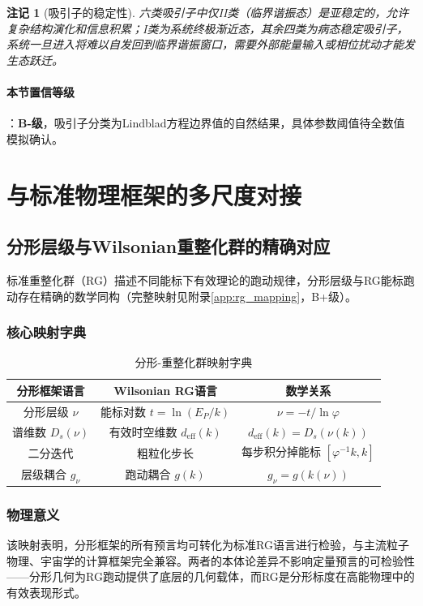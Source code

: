 \documentclass[12pt,a4paper,twocolumn]{article}
\renewcommand{\phi}{\varphi}
\newtheorem{remark}[theorem]{注记}
\begin{document}
\begin{remark}[吸引子的稳定性]
六类吸引子中仅II类（临界谐振态）是亚稳定的，允许复杂结构演化和信息积累；I类为系统终极渐近态，其余四类为病态稳定吸引子，系统一旦进入将难以自发回到临界谐振窗口，需要外部能量输入或相位扰动才能发生态跃迁。
\end{remark}

\paragraph{本节置信等级}：\textbf{B-级}，吸引子分类为Lindblad方程边界值的自然结果，具体参数阈值待全数值模拟确认。

\section{与标准物理框架的多尺度对接}

\subsection{分形层级与Wilsonian重整化群的精确对应}
标准重整化群（RG）描述不同能标下有效理论的跑动规律，分形层级与RG能标跑动存在精确的数学同构（完整映射见附录\ref{app:rg_mapping}，B+级）。

\subsubsection{核心映射字典}
\begin{table}[H]
\centering
\footnotesize
\caption{分形-重整化群映射字典}
\begin{tabular}{c|c|c}
\hline
\textbf{分形框架语言} & \textbf{Wilsonian RG语言} & \textbf{数学关系} \\
\hline
分形层级 $\nu$ & 能标对数 $t=\ln(E_P/k)$ & $\nu = -t/\ln\phi$ \\
谱维数 $D_s(\nu)$ & 有效时空维数 $d_{\text{eff}}(k)$ & $d_{\text{eff}}(k) = D_s(\nu(k))$ \\
二分迭代 & 粗粒化步长 & 每步积分掉能标 $[\phi^{-1}k,k]$ \\
层级耦合 $g_\nu$ & 跑动耦合 $g(k)$ & $g_\nu = g(k(\nu))$ \\
\hline
\end{tabular}
\end{table}

\subsubsection{物理意义}
该映射表明，分形框架的所有预言均可转化为标准RG语言进行检验，与主流粒子物理、宇宙学的计算框架完全兼容。两者的本体论差异不影响定量预言的可检验性——分形几何为RG跑动提供了底层的几何载体，而RG是分形标度在高能物理中的有效表现形式。
\end{document}
